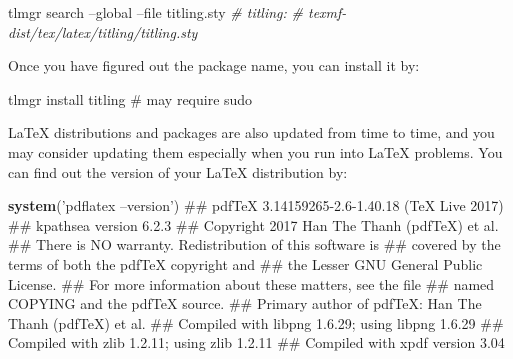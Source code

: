 \documentclass[12pt,]{krantz}
\makeatletter
\newenvironment{Shaded}{\begin{snugshade}}{\end{snugshade}}
\newcommand{\KeywordTok}[1]{\textcolor[rgb]{0.13,0.29,0.53}{\textbf{#1}}}
\newcommand{\StringTok}[1]{\textcolor[rgb]{0.31,0.60,0.02}{#1}}
\newcommand{\CommentTok}[1]{\textcolor[rgb]{0.56,0.35,0.01}{\textit{#1}}}
\newcommand{\ExtensionTok}[1]{#1}
\newcommand{\NormalTok}[1]{#1}
\newenvironment{kframe}{%
\medskip{}
\setlength{\fboxsep}{.8em}
 \def\at@end@of@kframe{}%
 \ifinner\ifhmode%
  \def\at@end@of@kframe{\end{minipage}}%
  \begin{minipage}{\columnwidth}%
 \fi\fi%
 \def\FrameCommand##1{\hskip\@totalleftmargin \hskip-\fboxsep
 \colorbox{shadecolor}{##1}\hskip-\fboxsep
     \hskip-\linewidth \hskip-\@totalleftmargin \hskip\columnwidth}%
 \MakeFramed {\advance\hsize-\width
   \@totalleftmargin\z@ \linewidth\hsize
   \@setminipage}}%
 {\par\unskip\endMakeFramed%
 \at@end@of@kframe}
\renewenvironment{Shaded}{\begin{kframe}}{\end{kframe}}
\theoremstyle{definition}
\theoremstyle{definition}
\theoremstyle{definition}
\theoremstyle{remark}
\makeatother
\begin{document}
\begin{Shaded}
\begin{Highlighting}[]
\ExtensionTok{tlmgr}\NormalTok{ search --global --file titling.sty}
\CommentTok{# titling:}
\CommentTok{#    texmf-dist/tex/latex/titling/titling.sty}
\end{Highlighting}
\end{Shaded}

Once you have figured out the package name, you can install it by:

\begin{Shaded}
\begin{Highlighting}[]
\ExtensionTok{tlmgr}\NormalTok{ install titling  # may require sudo}
\end{Highlighting}
\end{Shaded}

LaTeX distributions and packages are also updated from time to time, and
you may consider updating them especially when you run into LaTeX
problems. You can find out the version of your LaTeX distribution by:

\begin{Shaded}
\begin{Highlighting}[]
\KeywordTok{system}\NormalTok{(}\StringTok{'pdflatex --version'}\NormalTok{)}
\NormalTok{## pdfTeX 3.14159265-2.6-1.40.18 (TeX Live 2017)}
\NormalTok{## kpathsea version 6.2.3}
\NormalTok{## Copyright 2017 Han The Thanh (pdfTeX) et al.}
\NormalTok{## There is NO warranty.  Redistribution of this software is}
\NormalTok{## covered by the terms of both the pdfTeX copyright and}
\NormalTok{## the Lesser GNU General Public License.}
\NormalTok{## For more information about these matters, see the file}
\NormalTok{## named COPYING and the pdfTeX source.}
\NormalTok{## Primary author of pdfTeX: Han The Thanh (pdfTeX) et al.}
\NormalTok{## Compiled with libpng 1.6.29; using libpng 1.6.29}
\NormalTok{## Compiled with zlib 1.2.11; using zlib 1.2.11}
\NormalTok{## Compiled with xpdf version 3.04}
\end{Highlighting}
\end{Shaded}



\backmatter
\printindex
\end{document}
